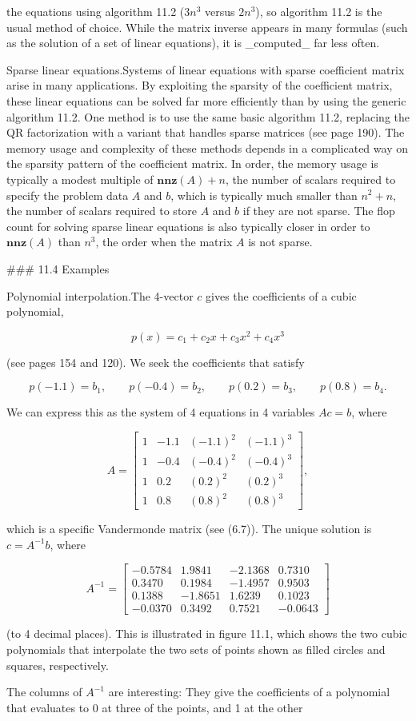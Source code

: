 the equations using algorithm 11.2 (\(3n^{3}\) versus \(2n^{3}\)), so algorithm 11.2 is the usual method of choice. While the matrix inverse appears in many formulas (such as the solution of a set of linear equations), it is _computed_ far less often.

Sparse linear equations.Systems of linear equations with sparse coefficient matrix arise in many applications. By exploiting the sparsity of the coefficient matrix, these linear equations can be solved far more efficiently than by using the generic algorithm 11.2. One method is to use the same basic algorithm 11.2, replacing the QR factorization with a variant that handles sparse matrices (see page 190). The memory usage and complexity of these methods depends in a complicated way on the sparsity pattern of the coefficient matrix. In order, the memory usage is typically a modest multiple of \(\mathbf{nnz}(A)+n\), the number of scalars required to specify the problem data \(A\) and \(b\), which is typically much smaller than \(n^{2}+n\), the number of scalars required to store \(A\) and \(b\) if they are not sparse. The flop count for solving sparse linear equations is also typically closer in order to \(\mathbf{nnz}(A)\) than \(n^{3}\), the order when the matrix \(A\) is not sparse.

### 11.4 Examples

Polynomial interpolation.The 4-vector \(c\) gives the coefficients of a cubic polynomial,

\[p(x)=c_{1}+c_{2}x+c_{3}x^{2}+c_{4}x^{3}\]

(see pages 154 and 120). We seek the coefficients that satisfy

\[p(-1.1)=b_{1},\qquad p(-0.4)=b_{2},\qquad p(0.2)=b_{3},\qquad p(0.8)=b_{4}.\]

We can express this as the system of 4 equations in 4 variables \(Ac=b\), where

\[A=\left[\begin{array}{rrrr}1&-1.1&(-1.1)^{2}&(-1.1)^{3}\\ 1&-0.4&(-0.4)^{2}&(-0.4)^{3}\\ 1&0.2&(0.2)^{2}&(0.2)^{3}\\ 1&0.8&(0.8)^{2}&(0.8)^{3}\end{array}\right],\]

which is a specific Vandermonde matrix (see (6.7)). The unique solution is \(c=A^{-1}b\), where

\[A^{-1}=\left[\begin{array}{rrrr}-0.5784&1.9841&-2.1368&0.7310\\ 0.3470&0.1984&-1.4957&0.9503\\ 0.1388&-1.8651&1.6239&0.1023\\ -0.0370&0.3492&0.7521&-0.0643\end{array}\right]\]

(to 4 decimal places). This is illustrated in figure 11.1, which shows the two cubic polynomials that interpolate the two sets of points shown as filled circles and squares, respectively.

The columns of \(A^{-1}\) are interesting: They give the coefficients of a polynomial that evaluates to 0 at three of the points, and 1 at the other 